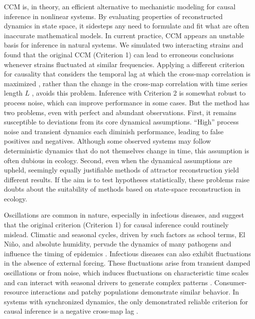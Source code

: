 CCM is, in theory, an efficient alternative to mechanistic modeling for causal inference in nonlinear systems.
By evaluating properties of reconstructed dynamics in state space, it sidesteps any need to formulate and fit what are often inaccurate mathematical models.
In current practice, CCM appears an unstable basis for inference in natural systems.
We simulated two interacting strains and found that the original CCM (Criterion 1) can lead to erroneous conclusions whenever strains fluctuated at similar frequencies.
Applying a different criterion for causality that considers the temporal lag at which the cross-map correlation is maximized \cite{Ye2015}, rather than the change in the cross-map correlation with time series length $L$ \cite{Sugihara2012}, avoids this problem.
Inference with Criterion 2 is somewhat robust to process noise, which can improve performance in some cases.
But the method has two problems, even with perfect and abundant observations.
First, it remains susceptible to deviations from its core dynamical assumptions. 
``High'' process noise and transient dynamics each diminish performance, leading to false positives and negatives.
Although some observed systems may follow deterministic dynamics that do not themselves change in time, this assumption is often dubious in ecology.
Second, even when the dynamical assumptions are upheld, seemingly equally justifiable methods of attractor reconstruction yield different results.
If the aim is to test hypotheses statistically, these problems raise doubts about the suitability of methods based on state-space reconstruction in ecology.

Oscillations are common in nature, especially in infectious diseases, and suggest that the original criterion (Criterion 1) for causal inference could routinely mislead.
Climatic and seasonal cycles, driven by such factors as school terms, El Ni{\~{n}}o, and absolute humidity, pervade the dynamics of many pathogens and influence the timing of epidemics \cite{Shaman2010, Laneri2010, Finkenstadt2000, Altizer2006, Metcalf2009}. 
Infectious diseases can also exhibit fluctuations in the absence of external forcing.
These fluctuations arise from transient damped oscillations or from noise, which induces fluctuations on characteristic time scales and can interact with seasonal drivers to generate complex patterns \cite{Alonso2006, Nguyen2008, Rand1991, Rohani2002}.
Consumer-resource interactions \cite{Boland2009, McKane2005, Turchin2003} and patchy populations \cite{Nisbet1978, Durrett1994} demonstrate similar behavior.
In systems with synchronized dynamics, the only demonstrated reliable criterion for causal inference is a negative cross-map lag \cite{Ye2015}.

